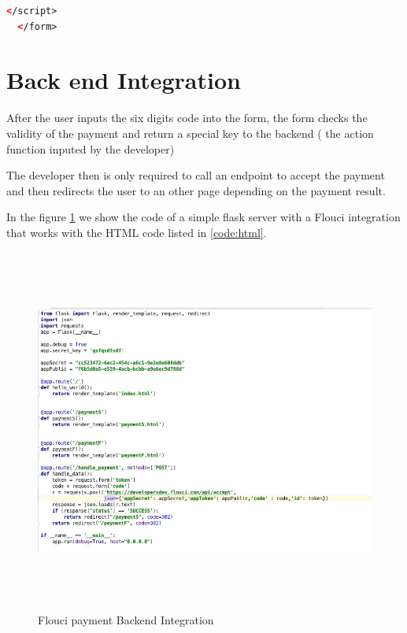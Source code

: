 \begin{spacing}{1.2}
\begin{lstlisting}[label=code:html,caption=Flouci Integration Java,language=xml]
    </script>
  </form>
\end{lstlisting}


\section{Back end Integration}
After the user inputs the six digits code into the form, the form checks the validity of the payment and return a special key to the backend ( the action function inputed by the developer)

The developer then is only required to call an endpoint to accept the payment and then redirects the user to an other page depending on the payment result. 

In the figure \ref{fig:flask} we show the code of a simple flask server with a Flouci integration that works with the HTML code listed in \ref{code:html}.
\begin{figure}[H]\centering
\includegraphics[width=\textwidth,height=12cm]{flask.png}
\caption{Flouci payment Backend Integration}
\label{fig:flask}
\end{figure}

\end{spacing}
